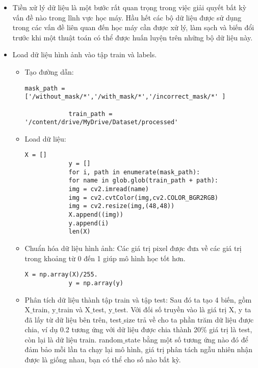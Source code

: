 \begin{itemize}
	\item Tiền xử lý dữ liệu là một bước rất quan trọng trong việc giải quyết bất kỳ vấn đề nào trong lĩnh vực học máy. Hầu hết các bộ dữ liệu được sử dụng trong các vấn đề liên quan đến học máy cần được xử lý, làm sạch và biến đổi trước khi một thuật toán có thể được huấn luyện trên những bộ dữ liệu này.
	
	\item Load dữ liệu hình ảnh vào tập train và labels.
	
	\begin{itemize}
		\item Tạo đường dẫn:
		
		\begin{lstlisting}[style=codePython]
			mask_path = ['/without_mask/*','/with_mask/*','/incorrect_mask/*' ]
			
			train_path = '/content/drive/MyDrive/Dataset/processed'			
		\end{lstlisting}
		
		\item Load dữ liệu:
		
		\begin{lstlisting}[style=codePython]
			X = []
			y = []
			for i, path in enumerate(mask_path):
			for name in glob.glob(train_path + path):
			img = cv2.imread(name)
			img = cv2.cvtColor(img,cv2.COLOR_BGR2RGB)
			img = cv2.resize(img,(48,48))
			X.append((img))
			y.append(i)
			len(X)					
		\end{lstlisting}
	
		\item Chuẩn hóa dữ liệu hình ảnh: Các giá trị pixel được đưa về các giá trị trong khoảng từ 0 đến 1 giúp mô hình học tốt hơn.
		
		\begin{lstlisting}[style=codePython]
			X = np.array(X)/255.
			y = np.array(y)			
		\end{lstlisting}
	
		\item Phân tích dữ liệu thành tập train và tập test: Sau đó ta tạo 4 biến, gồm X$\_$train, y$\_$train và X$\_$test, y$\_$test. Với đối số truyền vào là giá trị X, y ta đã lấy từ dữ liệu bên trên, test$\_$size trả về cho ta phần trăm dữ liệu được chia, ví dụ 0.2 tương ứng với dữ liệu được chia thành 20\% giá trị là test, còn lại là dữ liệu train. random$\_$state bằng một số tương ứng nào đó để đảm bảo mỗi lần ta chạy lại mô hình, giá trị phân tách ngẫu nhiên nhận được là giống nhau, bạn có thể cho số nào bất kỳ. 
		

\end{itemize}
\end{itemize}
